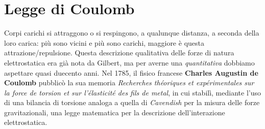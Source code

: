 \section{Legge di Coulomb}
Corpi carichi si attraggono o si respingono, a qualunque distanza, a seconda della loro carica: più sono vicini e più sono carichi, maggiore è questa attrazione/repulsione. Questa descrizione qualitativa delle forze di natura elettrostatica era già nota da Gilbert, ma per averne una \textit{quantitativa} dobbiamo aspettare quasi duecento anni.
Nel 1785, il fisico francese \textbf{Charles Augustin de Coulomb} pubblicò la sua memoria \textit{Recherches théoriques et expérimentales sur la force de torsion et sur l'élasticité des fils de metal}, in cui stabilì, mediante l'uso di una bilancia di torsione analoga a quella di \textit{Cavendish} per la misura delle forze gravitazionali, una legge matematica per la descrizione dell'interazione elettrostatica.
